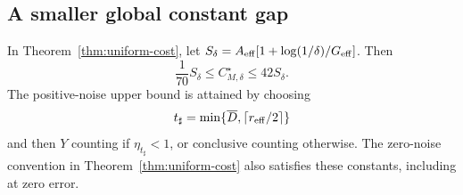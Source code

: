 \subsection{A smaller global constant gap}
\begin{theorem}
\label{thm:sharp-global}
In Theorem~\ref{thm:uniform-cost}, let
$S_\delta=A_{\rm eff}[1+\log(1/\delta)/G_{\rm eff}]$. Then
\begin{equation}\label{eq:sharp-global}
 \frac1{70}S_\delta\leq C_{M,\delta}^\star\leq42S_\delta.
\end{equation}
The positive-noise upper bound is attained by choosing
\begin{equation}\label{eq:sharp-depth}
 t_\sharp=\min\{\overline D,\lceil r_{\mathrm{eff}}/2\rceil\}
\end{equation}
and then $Y$ counting if $\eta_{t_\sharp}<1$, or conclusive counting
otherwise. The zero-noise convention in Theorem~\ref{thm:uniform-cost}
also satisfies these constants, including at zero error.
\end{theorem}

